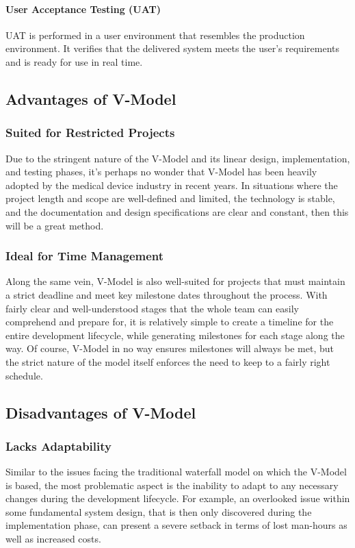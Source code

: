 \documentclass[main.tex]{subfiles}
\begin{document}
\paragraph{User Acceptance Testing (UAT)}
UAT is performed in a user environment that resembles the production environment. It verifies that the delivered system meets the user’s requirements and is ready for use in real time.

\subsection{Advantages of V-Model}

\subsubsection{Suited for Restricted Projects}
Due to the stringent nature of the V-Model and its linear design, implementation, and testing phases, it's perhaps no wonder that V-Model has been heavily adopted by the medical device industry in recent years.
In situations where the project length and scope are well-defined and limited, the technology is stable, and the documentation and design specifications are clear and constant, then this will be a great method.

\subsubsection{Ideal for Time Management}
Along the same vein, V-Model is also well-suited for projects that must maintain a strict deadline and meet key milestone dates throughout the process.
With fairly clear and well-understood stages that the whole team can easily comprehend and prepare for, it is relatively simple to create a timeline for the entire development lifecycle, while generating milestones for each stage along the way. Of course, V-Model in no way ensures milestones will always be met, but the strict nature of the model itself enforces the need to keep to a fairly right schedule.

\subsection{Disadvantages of V-Model}

\subsubsection{Lacks Adaptability}
Similar to the issues facing the traditional waterfall model on which the V-Model is based, the most problematic aspect is the inability to adapt to any necessary changes during the development lifecycle.
For example, an overlooked issue within some fundamental system design, that is then only discovered during the implementation phase, can present a severe setback in terms of lost man-hours as well as increased costs.
\end{document}
